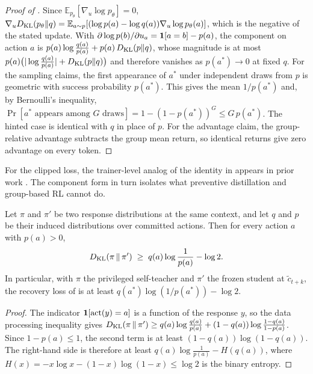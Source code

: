 \begin{proof}[Proof of ]
Since $\mathbb{E}_{p_\theta}[\nabla_u \log p_\theta] = 0$,
$\nabla_u D_{\mathrm{KL}}(p_\theta \| q) = \mathbb{E}_{a \sim p}\!\left[ (\log p(a) - \log q(a)) \nabla_u \log p_\theta(a) \right]$,
which is the negative of the stated update. With $\partial \log p(b) / \partial u_a = \bm{1}[a = b] - p(a)$, the component on action $a$ is $p(a) \log \tfrac{q(a)}{p(a)} + p(a)\, D_{\mathrm{KL}}(p \| q)$, whose magnitude is at most $p(a) \bigl( |\log \tfrac{q(a)}{p(a)}| + D_{\mathrm{KL}}(p \| q) \bigr)$ and therefore vanishes as $p(a^{*}) \to 0$ at fixed $q$. For the sampling claims, the first appearance of $a^{*}$ under independent draws from $p$ is geometric with success probability $p(a^{*})$. This gives the mean $1/p(a^{*})$ and, by Bernoulli's inequality, $\Pr[a^{*} \text{ appears among } G \text{ draws}] = 1 - (1 - p(a^{*}))^{G} \le G\, p(a^{*})$. The hinted case is identical with $q$ in place of $p$. For the advantage claim, the group-relative advantage subtracts the group mean return, so identical returns give zero advantage on every token.
\end{proof}

For the clipped loss, the trainer-level analog of the identity in  appears in prior work \citep{yang2026opid}. The component form in turn isolates what preventive distillation and group-based RL cannot do.

\begin{lemma}
\label{lem:kl_bound}
Let $\pi$ and $\pi'$ be two response distributions at the same context, and let $q$ and $p$ be their induced distributions over committed actions. Then for every action $a$ with $p(a) > 0$,
\begin{equation}
D_{\mathrm{KL}}(\pi \,\|\, \pi') \;\ge\; q(a) \log \frac{1}{p(a)} - \log 2.
\label{eq:kl_bound}
\end{equation}
In particular, with $\pi$ the privileged self-teacher and $\pi'$ the frozen student at $\tilde{c}_{t+k}$, the recovery loss of  is at least $q(a^{*}) \log(1/p(a^{*})) - \log 2$.
\end{lemma}

\begin{proof}
The indicator $\bm{1}[\operatorname{act}(y) = a]$ is a function of the response $y$, so the data processing inequality gives $D_{\mathrm{KL}}(\pi \,\|\, \pi') \ge q(a) \log \frac{q(a)}{p(a)} + (1 - q(a)) \log \frac{1 - q(a)}{1 - p(a)}$. Since $1 - p(a) \le 1$, the second term is at least $(1 - q(a)) \log (1 - q(a))$. The right-hand side is therefore at least $q(a) \log \frac{1}{p(a)} - H(q(a))$, where $H(x) = -x \log x - (1 - x) \log (1 - x) \le \log 2$ is the binary entropy.
\end{proof}

